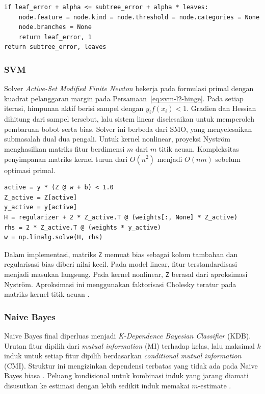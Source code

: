\begin{lstlisting}[caption={Keputusan pemangkasan subpohon CART},label={lst-dtl-cost-complexity}]
if leaf_error + alpha <= subtree_error + alpha * leaves:
    node.feature = node.kind = node.threshold = node.categories = None
    node.branches = None
    return leaf_error, 1
return subtree_error, leaves
\end{lstlisting}

\subsubsection{SVM}

Solver \textit{Active-Set Modified Finite Newton} bekerja pada formulasi
primal dengan kuadrat pelanggaran margin pada
Persamaan~\ref{eq:svm-l2-hinge}.
Pada setiap iterasi, himpunan aktif berisi sampel dengan $y_i f(x_i)<1$.
Gradien dan Hessian dihitung dari sampel tersebut, lalu sistem linear
diselesaikan untuk memperoleh pembaruan bobot serta bias. Solver ini
berbeda dari SMO, yang menyelesaikan submasalah dual dua pengali. Untuk
kernel nonlinear, proyeksi Nystr\"om menghasilkan matriks fitur berdimensi
$m$ dari $m$ titik acuan. Kompleksitas penyimpanan matriks kernel turun dari
$O(n^2)$ menjadi $O(nm)$ sebelum optimasi primal.

\begin{lstlisting}[caption={Pembaruan primal melalui sistem Newton},label={lst-svm-active-newton}]
active = y * (Z @ w + b) < 1.0
Z_active = Z[active]
y_active = y[active]
H = regularizer + 2 * Z_active.T @ (weights[:, None] * Z_active)
rhs = 2 * Z_active.T @ (weights * y_active)
w = np.linalg.solve(H, rhs)
\end{lstlisting}

Dalam implementasi, matriks \texttt{Z} memuat bias sebagai kolom tambahan
dan regularisasi bias diberi nilai kecil. Pada model linear, fitur
terstandardisasi menjadi masukan langsung. Pada kernel nonlinear, \texttt{Z}
berasal dari aproksimasi Nystr\"om. Aproksimasi ini menggunakan faktorisasi
Cholesky teratur pada matriks kernel titik acuan
\cite{keerthi2005newton,williams2001nystrom}.

\subsubsection{Naive Bayes}

Naive Bayes final diperluas menjadi \textit{K-Dependence Bayesian
    Classifier} (KDB). Urutan fitur dipilih dari \textit{mutual information}
(MI) terhadap kelas, lalu maksimal $k$ induk untuk setiap fitur dipilih
berdasarkan \textit{conditional mutual information} (CMI). Struktur ini
mengizinkan dependensi terbatas yang tidak ada pada Naive Bayes biasa
\cite{sahami1996limited,friedman1997bayesian}. Peluang kondisional untuk
kombinasi induk yang jarang diamati disusutkan ke estimasi dengan lebih
sedikit induk memakai $m$-estimate \cite{cestnik1990estimating}.

